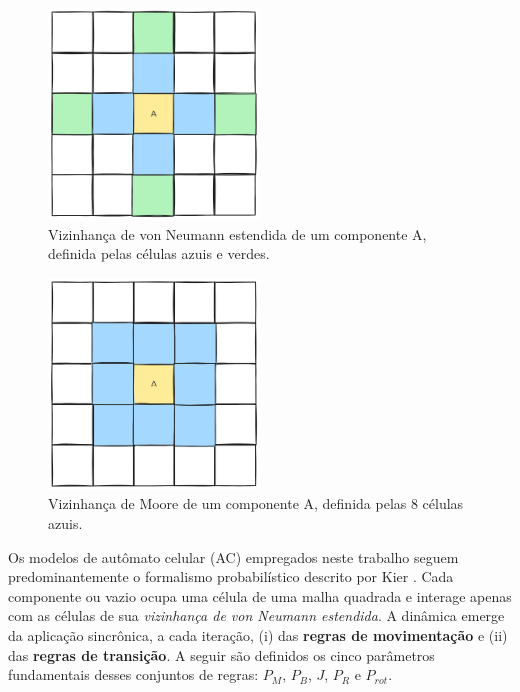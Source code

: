 \documentclass[12pt,oneside]{report}
\begin{document}
\begin{figure}[H]
    \centering
    \includegraphics[width=0.5\textwidth]{vizinhanca_von_neumann_estendida.png}
    \caption{\small Vizinhança de von Neumann estendida de um componente A, definida pelas células azuis e verdes.}
    \label{fig:vizinhanca_von_neumann_estendida}
\end{figure}

\begin{figure}[H]
    \centering
    \includegraphics[width=0.5\textwidth]{vizinhanca_moore.png}
    \caption{\small Vizinhança de Moore de um componente A, definida pelas 8 células azuis.}
    \label{fig:vizinhanca_moore}
\end{figure}

Os modelos de autômato celular (AC) empregados neste trabalho seguem predominantemente o formalismo probabilístico descrito por Kier \cite{kier2005}. Cada componente ou vazio ocupa uma célula de uma malha quadrada e interage apenas com as células de sua \textit{vizinhança de von Neumann estendida}. A dinâmica emerge da aplicação sincrônica, a cada iteração, (i) das \textbf{regras de movimentação} e (ii) das \textbf{regras de transição}. A seguir são definidos os cinco parâmetros fundamentais desses conjuntos de regras: $P_M$, $P_B$, $J$, $P_R$ e $P_{rot}$.
\end{document}
